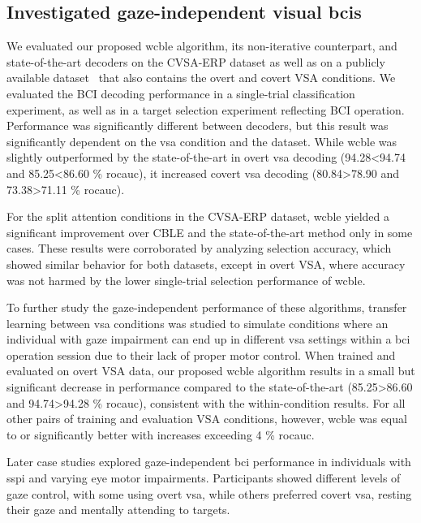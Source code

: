 \subsection{Investigated gaze-independent visual \acsp{bci}}

We evaluated our proposed \ac{wcble} algorithm, its non-iterative
counterpart, and state-of-the-art decoders on the CVSA-ERP dataset as well as on a publicly available
dataset~\cite{Aloise2012} that also contains the overt and covert VSA conditions.
We evaluated the BCI decoding performance in a single-trial classification experiment,
as well as in a target selection experiment reflecting BCI operation.
Performance was significantly different between decoders, but this
result was significantly dependent on the \ac{vsa} condition and the dataset.
While \ac{wcble} was slightly outperformed by the state-of-the-art in overt \ac{vsa}
decoding (94.28<94.74 and  85.25<86.60 \% \acs{rocauc}),
it increased covert \ac{vsa} decoding (80.84>78.90 and 73.38>71.11 \%
\acs{rocauc}).

For the split attention conditions in the CVSA-ERP
dataset, \ac{wcble} yielded a significant improvement over CBLE and the
state-of-the-art method only in some cases.
These results were corroborated by analyzing selection accuracy, which showed
similar behavior for both datasets, except in overt
VSA, where accuracy was not harmed by the lower
single-trial selection performance of \ac{wcble}.

To further study the gaze-independent performance of these algorithms, transfer
learning between \ac{vsa} conditions was studied to simulate conditions where an
individual with gaze impairment can end up in different \ac{vsa} settings within
a \ac{bci} operation session due to their lack of proper motor control.
When trained and evaluated on overt VSA data, our proposed \ac{wcble} algorithm
results in a small but significant decrease in performance compared to the state-of-the-art
(85.25>86.60 and 94.74>94.28 \% \acs{rocauc}), consistent with the within-condition
results.
For all other pairs of training and evaluation VSA conditions, however,
\ac{wcble} was equal to or significantly better with increases exceeding 4 \%
\ac{rocauc}.

Later case studies explored gaze-independent
\ac{bci} performance in individuals with \ac{sspi} and varying eye motor impairments.
Participants showed different levels of gaze control, with some using overt
\ac{vsa}, while others preferred covert \ac{vsa}, resting their gaze and
mentally attending to targets.

